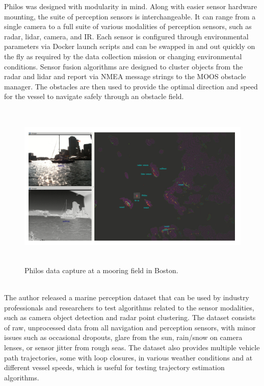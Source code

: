 Philos was designed with modularity in mind. Along with easier sensor hardware mounting, the suite of perception sensors is interchangeable. It can range from a single camera to a full suite of various modalities of perception sensors, such as radar, lidar, camera, and IR. Each sensor is configured through environmental parameters via Docker launch scripts and can be swapped in and out quickly on the fly as required by the data collection mission or changing environmental conditions. Sensor fusion algorithms are designed to
cluster objects from the radar and lidar and report via NMEA
message strings to the MOOS obstacle manager. The obstacles are then used to provide the optimal direction and speed for the vessel to navigate safely through an obstacle field.\cite{benjamin2009overview}
\begin{figure}[H]
    \centering
    \includegraphics[width=\textwidth,height=8cm,keepaspectratio=true]{src/Images/philos_op.PNG}
    \caption{
     Philos data capture at a mooring field in Boston.  \cite{defilippo2021robowhaler}
     }
\end{figure}
\\

The author released a marine perception dataset that can be used by industry professionals and researchers to test algorithms related to the sensor modalities, such as camera object detection and radar point clustering. The dataset consists of raw, unprocessed data from all navigation and perception sensors, with minor issues such as occasional dropouts, glare from the sun, rain/snow on camera lenses, or sensor jitter from rough seas. The dataset also provides multiple vehicle path trajectories, some with loop closures, in various weather conditions and at different vessel speeds, which is useful for testing trajectory estimation algorithms.\cite{benjamin2009overview}
\\

